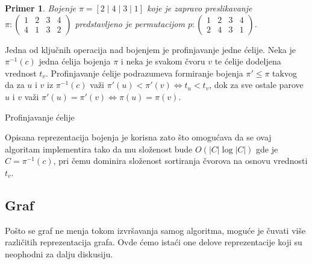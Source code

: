 \documentclass[12pt,oneside]{memoir}
\newtheorem{example}{Primer}
\theoremstyle{definition}
\begin{document}
   \begin{example}
	   Bojenje $\pi = [2 \mid 4 \mid 3 \mid 1]$ koje je zapravo preslikavanje
	   $\pi :
	   \begin{pmatrix}
		   1 & 2 & 3 & 4\\
		   4 & 1 & 3 & 2
	   \end{pmatrix}$ predstavljeno je permutacijom
	   $p :
	   \begin{pmatrix}
		   1 & 2 & 3 & 4\\
		   2 & 4 & 3 & 1
	   \end{pmatrix}$.
   \end{example}

   Jedna od ključnih operacija nad bojenjem je profinjavanje jedne ćelije. Neka
   je $\pi^{-1}(c)$ jedna ćelija bojenja $\pi$ i neka je svakom čvoru $v$ te
   ćelije dodeljena vrednost $t_v$. Profinjavanje ćelije podrazumeva formiranje
   bojenja $\pi' \leq \pi$ takvog da za $u$ i $v$ iz $\pi^{-1}(c)$ važi
   $\pi'(u) < \pi'(v) \iff t_u < t_v$, dok za sve ostale parove $u$ i $v$ važi
   $\pi'(u) = \pi'(v) \iff \pi(u) = \pi(v)$.

  \begin{algorithm}[H]
	  \caption{Profinjavanje ćelije}
	  \begin{algorithmic}[]
	      \EndFor
		  \State{}
		  \EndProcedure
	  \end{algorithmic}
  \end{algorithm}

  Opisana reprezentacija bojenja je korisna zato što omogućava da se ovaj
  algoritam implementira tako da mu složenost bude $O(|C| \log |C|)$ gde je $C
  = \pi^{-1}(c)$, pri čemu dominira složenost sortiranja čvorova na osnovu
  vrednosti $t_v$.

  \subsection{Graf}

   Pošto se graf ne menja tokom izvršavanja samog algoritma, moguće je čuvati
   više različitih reprezentacija grafa. Ovde ćemo istaći one delove
   reprezentacije koji su neophodni za dalju diskusiju.
\end{document}
